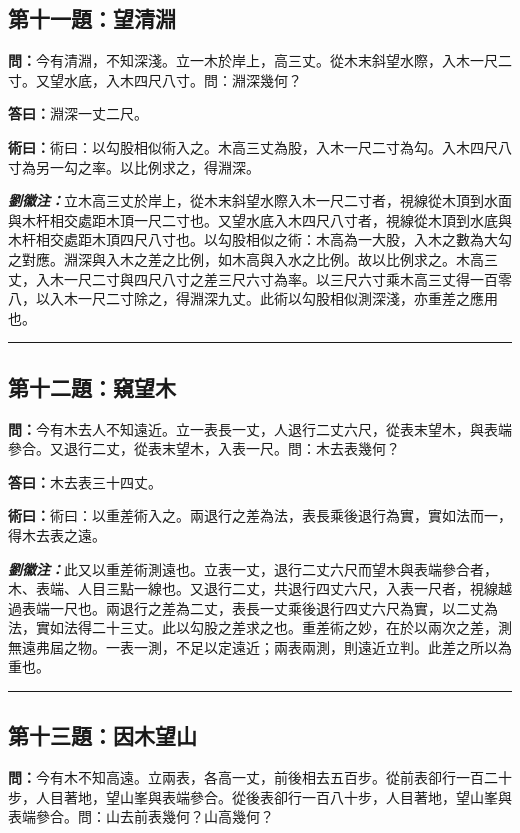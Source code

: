 \documentclass[11pt,a4paper]{article}
\newcommand{\wen}[1]{\textbf{\color{problemcolor}問：}#1\par}
\newcommand{\da}[1]{\textbf{答曰：}#1\par}
\newcommand{\shu}[1]{\textbf{術曰：}#1\par}
\newcommand{\liuhui}[1]{{\color{commentarycolor}\textit{\textbf{劉徽注：}}#1\par}}
\begin{document}
\subsection{第十一題：望清淵}

\wen{今有清淵，不知深淺。立一木於岸上，高三丈。從木末斜望水際，入木一尺二寸。又望水底，入木四尺八寸。問：淵深幾何？}

\da{淵深一丈二尺。}

\shu{術曰：以勾股相似術入之。木高三丈為股，入木一尺二寸為勾。入木四尺八寸為另一勾之率。以比例求之，得淵深。}

\liuhui{立木高三丈於岸上，從木末斜望水際入木一尺二寸者，視線從木頂到水面與木杆相交處距木頂一尺二寸也。又望水底入木四尺八寸者，視線從木頂到水底與木杆相交處距木頂四尺八寸也。以勾股相似之術：木高為一大股，入木之數為大勾之對應。淵深與入木之差之比例，如木高與入水之比例。故以比例求之。木高三丈，入木一尺二寸與四尺八寸之差三尺六寸為率。以三尺六寸乘木高三丈得一百零八，以入木一尺二寸除之，得淵深九丈。此術以勾股相似測深淺，亦重差之應用也。}

\bigskip
\hrule
\bigskip

\subsection{第十二題：窺望木}

\wen{今有木去人不知遠近。立一表長一丈，人退行二丈六尺，從表末望木，與表端參合。又退行二丈，從表末望木，入表一尺。問：木去表幾何？}

\da{木去表三十四丈。}

\shu{術曰：以重差術入之。兩退行之差為法，表長乘後退行為實，實如法而一，得木去表之遠。}

\liuhui{此又以重差術測遠也。立表一丈，退行二丈六尺而望木與表端參合者，木、表端、人目三點一線也。又退行二丈，共退行四丈六尺，入表一尺者，視線越過表端一尺也。兩退行之差為二丈，表長一丈乘後退行四丈六尺為實，以二丈為法，實如法得二十三丈。此以勾股之差求之也。重差術之妙，在於以兩次之差，測無遠弗屆之物。一表一測，不足以定遠近；兩表兩測，則遠近立判。此差之所以為重也。}

\bigskip
\hrule
\bigskip

\subsection{第十三題：因木望山}

\wen{今有木不知高遠。立兩表，各高一丈，前後相去五百步。從前表卻行一百二十步，人目著地，望山峯與表端參合。從後表卻行一百八十步，人目著地，望山峯與表端參合。問：山去前表幾何？山高幾何？}
\end{document}
